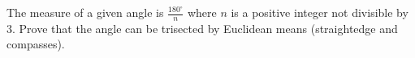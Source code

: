 The measure of a given angle is $\frac{180^{\circ}}{n}$ where $n$ is a positive integer not divisible by $3$. Prove that the angle can be trisected by Euclidean means (straightedge and compasses).